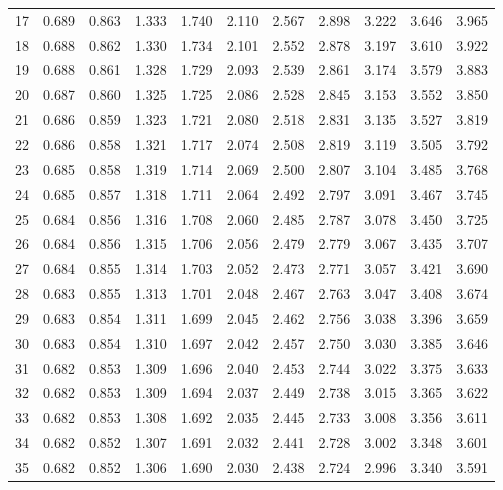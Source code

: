 \documentclass[lang=cn,10pt]{elegantbook}
\begin{document}
\begin{longtable}{c|cccccccccc}
    17 & 0.689 & 0.863 & 1.333 & 1.740 & 2.110  & 2.567  & 2.898  & 3.222   & 3.646   & 3.965 \\
    18 & 0.688 & 0.862 & 1.330 & 1.734 & 2.101  & 2.552  & 2.878  & 3.197   & 3.610   & 3.922 \\
    19 & 0.688 & 0.861 & 1.328 & 1.729 & 2.093  & 2.539  & 2.861  & 3.174   & 3.579   & 3.883 \\
    20 & 0.687 & 0.860 & 1.325 & 1.725 & 2.086  & 2.528  & 2.845  & 3.153   & 3.552   & 3.850 \\
    21 & 0.686 & 0.859 & 1.323 & 1.721 & 2.080  & 2.518  & 2.831  & 3.135   & 3.527   & 3.819 \\
    22 & 0.686 & 0.858 & 1.321 & 1.717 & 2.074  & 2.508  & 2.819  & 3.119   & 3.505   & 3.792 \\
    23 & 0.685 & 0.858 & 1.319 & 1.714 & 2.069  & 2.500  & 2.807  & 3.104   & 3.485   & 3.768 \\
    24 & 0.685 & 0.857 & 1.318 & 1.711 & 2.064  & 2.492  & 2.797  & 3.091   & 3.467   & 3.745 \\
    25 & 0.684 & 0.856 & 1.316 & 1.708 & 2.060  & 2.485  & 2.787  & 3.078   & 3.450   & 3.725 \\
    26 & 0.684 & 0.856 & 1.315 & 1.706 & 2.056  & 2.479  & 2.779  & 3.067   & 3.435   & 3.707 \\
    27 & 0.684 & 0.855 & 1.314 & 1.703 & 2.052  & 2.473  & 2.771  & 3.057   & 3.421   & 3.690 \\
    28 & 0.683 & 0.855 & 1.313 & 1.701 & 2.048  & 2.467  & 2.763  & 3.047   & 3.408   & 3.674 \\
    29 & 0.683 & 0.854 & 1.311 & 1.699 & 2.045  & 2.462  & 2.756  & 3.038   & 3.396   & 3.659 \\
    30 & 0.683 & 0.854 & 1.310 & 1.697 & 2.042  & 2.457  & 2.750  & 3.030   & 3.385   & 3.646 \\
    31 & 0.682 & 0.853 & 1.309 & 1.696 & 2.040  & 2.453  & 2.744  & 3.022   & 3.375   & 3.633 \\
    32 & 0.682 & 0.853 & 1.309 & 1.694 & 2.037  & 2.449  & 2.738  & 3.015   & 3.365   & 3.622 \\
    33 & 0.682 & 0.853 & 1.308 & 1.692 & 2.035  & 2.445  & 2.733  & 3.008   & 3.356   & 3.611 \\
    34 & 0.682 & 0.852 & 1.307 & 1.691 & 2.032  & 2.441  & 2.728  & 3.002   & 3.348   & 3.601 \\
    35 & 0.682 & 0.852 & 1.306 & 1.690 & 2.030  & 2.438  & 2.724  & 2.996   & 3.340   & 3.591 \\

\end{longtable}
\end{document}
